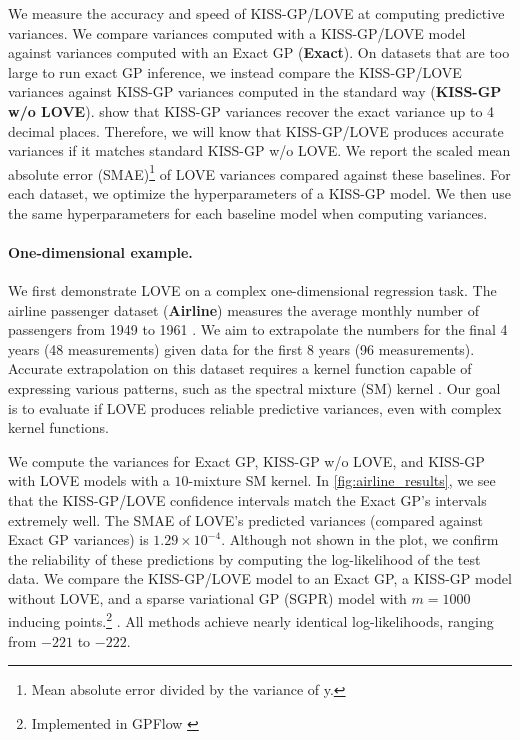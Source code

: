 We measure the accuracy and speed of KISS-GP/LOVE{} at computing predictive variances.
We compare variances computed with a KISS-GP/LOVE{} model against variances computed with an Exact GP ({\bf Exact}).
On datasets that are too large to run exact GP inference, we instead compare the KISS-GP/LOVE{} variances against KISS-GP variances computed in the standard way ({\bf KISS-GP w/o LOVE{}}).
\citet{wilson2015thoughts} show that KISS-GP variances recover the exact variance up to 4 decimal places.
Therefore, we will know that KISS-GP/LOVE{} produces accurate variances if it matches standard KISS-GP w/o LOVE{}.
We report the scaled mean absolute error (SMAE)\footnote{
  Mean absolute error divided by the variance of y.
} \cite{rasmussen2006gaussian} of LOVE{} variances compared against these baselines.
For each dataset, we optimize the hyperparameters of a KISS-GP model.
We then use the same hyperparameters for each baseline model when computing variances.

\paragraph{One-dimensional example.}
We first demonstrate LOVE{} on a complex one-dimensional regression task.
The airline passenger dataset ({\bf Airline}) measures the average monthly number of passengers from 1949 to 1961 \cite{hyndman2005time}.
We aim to extrapolate the numbers for the final 4 years (48 measurements) given data for the first 8 years (96 measurements).
Accurate extrapolation on this dataset requires a kernel function capable of expressing various patterns, such as the spectral mixture (SM) kernel \cite{wilson2013gaussian}.
Our goal is to evaluate if LOVE{} produces reliable predictive variances, even with complex kernel functions.

We compute the variances for Exact GP, KISS-GP w/o LOVE{}, and KISS-GP with LOVE{} models with a $10$-mixture SM kernel.
In \cref{fig:airline_results}, we see that the KISS-GP/LOVE{} confidence intervals match the Exact GP's intervals extremely well.
The SMAE of LOVE{}'s predicted variances (compared against Exact GP variances) is $1.29 \times 10^{-4}$.
Although not shown in the plot, we confirm the reliability of these predictions by computing the log-likelihood of the test data.
We compare the KISS-GP/LOVE{} model to an Exact GP, a KISS-GP model without LOVE{}, and a sparse variational GP (SGPR) model with $m=1000$ inducing points.\footnote{
 Implemented in GPFlow \cite{matthews2017gpflow}} \cite{titsias2009variational,hensman2013gaussian}.
All methods achieve nearly identical log-likelihoods, ranging from $-221$ to $-222$.

